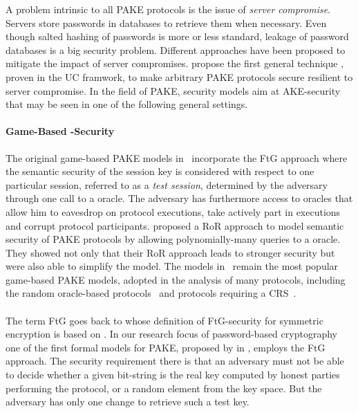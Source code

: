 A problem intrinsic to all \ac{PAKE} protocols is the issue of \emph{server compromise}.
Servers store passwords in databases to retrieve them when necessary.
Even though salted hashing of passwords is more or less standard, leakage of password databases is a big security problem.
Different approaches have been proposed to mitigate the impact of server compromises.
\citeauthor{Gentry2006} propose the first general technique \cite{Gentry2006}, proven in the \ac{UC} framwork, to make arbitrary \ac{PAKE} protocols secure resilient to server compromise.
In the field of \acl{PAKE}, security models aim at \ac{AKE}-security \cite{Bellare1993,Bellare1995} that may be seen in one of the following general settings.

\paragraph{Game-Based -Security}
The original game-based \ac{PAKE} models in~\cite{Bellare2000,Boyko2000} incorporate the \ac{FtG} approach where the semantic security of the session key is considered with respect to one particular session, referred to as a \emph{test session}, determined by the adversary through one call to a \Test oracle.
The adversary has furthermore access to oracles that allow him to eavesdrop on protocol executions, take actively part in executions and corrupt protocol participants.
\citeauthor{Abdalla2005} \cite{Abdalla2005} proposed a \ac{RoR} approach to model semantic security of PAKE protocols by allowing polynomially-many queries to a \Test oracle.
They showed not only that their \ac{RoR} approach leads to stronger security but were also able to simplify the model.
The models in~\cite{Bellare2000,Abdalla2005} remain the most popular game-based PAKE models, adopted in the analysis of many protocols, including the random oracle-based protocols~\cite{Abdalla2006,Abdalla2005b} and protocols requiring a \ac{CRS}~\cite{Gennaro2003,Gennaro2008,Katz2009a}.


\paragraph{}
The term \acl{FtG} goes back to \citeauthor{Bellare97} \cite{Bellare97} whose definition of \ac{FtG}-security for symmetric encryption is based on \cite{Goldwasser84} \cite{Micali86}.
In our research focus of password-based cryptography one of the first formal models for \ac{PAKE}, proposed by \citeauthor{Bellare2000} in \cite{Bellare2000}, employs the \ac{FtG} approach.
The security requirement there is that an adversary must not be able to decide whether a given bit-string is the real key computed by honest parties performing the protocol, or a random element from the key space.
But the adversary has only one change to retrieve such a test key.

